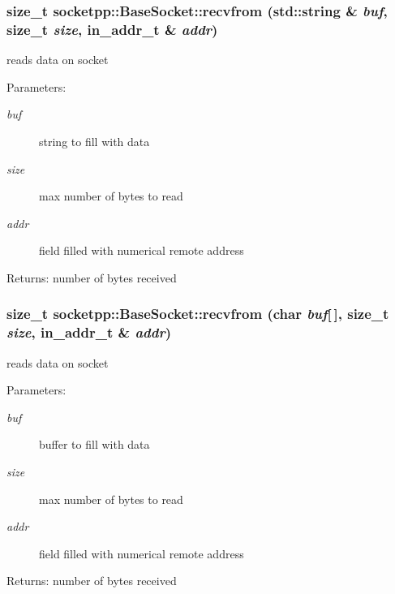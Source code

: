 \begin{CompactItemize}
{\subsubsection[{recvfrom}]{\setlength{\rightskip}{0pt plus 5cm}size\_\-t socketpp::BaseSocket::recvfrom (std::string \& {\em buf}, \/  size\_\-t {\em size}, \/  in\_\-addr\_\-t \& {\em addr})}}
\label{classsocketpp_1_1BaseSocket_8224b8434da862a72b774a3c80006fcb}


reads data on socket 

\begin{Desc}
\item[Parameters:]
\begin{description}
\item[{\em buf}]string to fill with data \item[{\em size}]max number of bytes to read \item[{\em addr}]field filled with numerical remote address \end{description}
\end{Desc}
\begin{Desc}
\item[Returns:]number of bytes received \end{Desc}
\hypertarget{classsocketpp_1_1BaseSocket_ed28eb7e4a5abee65143bcdf162673f4}{
\subsubsection[{recvfrom}]{\setlength{\rightskip}{0pt plus 5cm}size\_\-t socketpp::BaseSocket::recvfrom (char {\em buf}\mbox{[}$\,$\mbox{]}, \/  size\_\-t {\em size}, \/  in\_\-addr\_\-t \& {\em addr})}}
\label{classsocketpp_1_1BaseSocket_ed28eb7e4a5abee65143bcdf162673f4}


reads data on socket 

\begin{Desc}
\item[Parameters:]
\begin{description}
\item[{\em buf}]buffer to fill with data \item[{\em size}]max number of bytes to read \item[{\em addr}]field filled with numerical remote address \end{description}
\end{Desc}
\begin{Desc}
\item[Returns:]number of bytes received \end{Desc}
\hypertarget{classsocketpp_1_1BaseSocket_259bb054a2abf0ffadf3c75bce4892b0}{
}
\end{CompactItemize}
